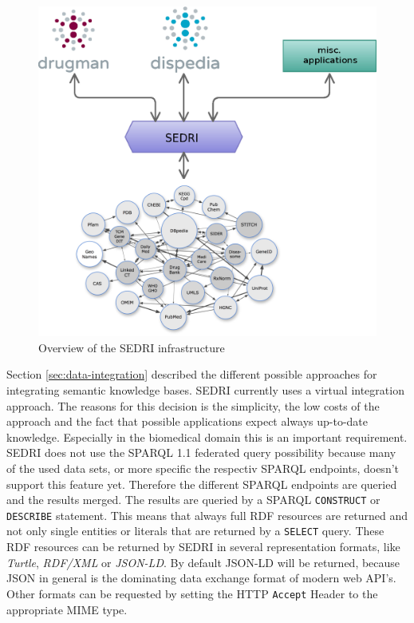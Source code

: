 \begin{figure}
  \centering
  \includegraphics[scale=0.7]{methods/wrapper2.eps}
  \caption{Overview of the SEDRI infrastructure}
  \label{fig:arch_sedri}
\end{figure}
Section \ref{sec:data-integration} described the different possible approaches for integrating semantic knowledge bases.
SEDRI currently uses a virtual integration approach.
The reasons for this decision is the simplicity, the low costs of the approach and the fact that possible applications expect always up-to-date knowledge.
Especially in the biomedical domain this is an important requirement.
SEDRI does not use the SPARQL 1.1 federated query possibility because many of the used data sets, or more specific the respectiv SPARQL endpoints, doesn't support this feature yet.
Therefore the different SPARQL endpoints are queried and the results merged.
The results are queried by a SPARQL \texttt{CONSTRUCT} or \texttt{DESCRIBE} statement.
This means that always full RDF resources are returned and not only single entities or literals that are returned by a \texttt{SELECT} query.
These RDF resources can be returned by SEDRI in several representation formats, like \textit{Turtle}, \textit{RDF/XML} or \textit{JSON-LD}.
By default JSON-LD will be returned, because JSON in general is the dominating data exchange format of modern web API's.
Other formats can be requested by setting the HTTP \texttt{Accept} Header to the appropriate MIME type.

